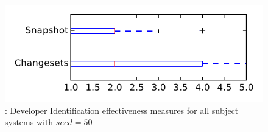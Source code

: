 
\begin{figure}
\centering
\includegraphics[height=0.4\textheight]{figures/dit_seed/rq1_tiny_50}
\caption{\rtwo: Developer Identification effectiveness measures for all subject systems with $seed=50$}
\label{fig:dit_seed:rq1:tiny}
\end{figure}
